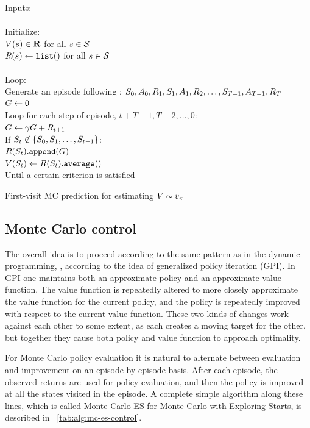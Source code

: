 \begin{table}
\beginalg
Inputs: \pol\\
\\
Initialize:\\
\> $V(s) \in \mathbf{R}$ for all $s\in\mathcal{S}$\\
\> $R(s) \leftarrow {\tt list()}$ for all $s\in\mathcal{S}$\\
\\
Loop: \\
\> Generate an episode following \pol: $S_{0}, A_{0}, R_{1}, S_{1}, A_{1}, R_{2}, \ldots, S_{T-1}, A_{T-1}, R_{T}$\\
\> $G \leftarrow 0$\\
\> Loop for each step of episode, $t+T-1, T-2, \ldots, 0$:\\
\> \> $G \leftarrow \gamma G + R_{t+1}$\\
\> \> If $S_{t} \not\in \{S_{0}, S_{1}, \ldots, S_{t-1}\}$:\\
\> \> \> $R(S_{t}){\tt.append}(G)$\\
\> \> \> $V(S_{t}) \leftarrow R(S_{t}){\tt .average()}$\\
Until a certain criterion is satisfied
\endalg
\caption{First-visit MC prediction for estimating $V \sim v_{\pi}$}
\label{tab:alg:first-visti-mc-prediction}
\end{table}


\subsection{Monte Carlo control}

The overall idea is to proceed according to the same pattern as in the dynamic programming, \ie,
according to the idea of generalized policy iteration (GPI).
In GPI one maintains both an approximate policy and an approximate value function.
The value function is repeatedly altered to more closely approximate
the value function for the current policy,
and the policy is repeatedly improved with respect to the current value function.
These two kinds of changes work against each other to some extent,
as each creates a moving target for the other,
but together they cause both policy and value function to approach optimality.

For Monte Carlo policy evaluation
it is natural to alternate between evaluation and improvement on an episode-by-episode basis.
After each episode,
the observed returns are used for policy evaluation,
and then the policy is improved at all the states visited in the episode.
A complete simple algorithm along these lines, which is called Monte Carlo ES for Monte Carlo with Exploring Starts,
is described in \tablename~\ref{tab:alg:mc-es-control}.


